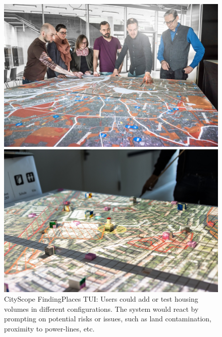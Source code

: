 \begin{figure}[!tbp]
  \centering
  \begin{minipage}[b]{0.48\textwidth}
    \includegraphics[width=\textwidth]{figures/finidingplaces1.jpg}
  \end{minipage}
  \hfill
  \begin{minipage}[b]{0.48\textwidth}
   \includegraphics[width=\textwidth]{figures/finidingplaces0.jpg}
  \end{minipage}
    \hfill
   \caption{CityScope FindingPlaces TUI: Users could add or test housing volumes in different configurations. The system would react by prompting on potential risks or issues, such as land contamination, proximity to power-lines, etc.  }
\end{figure}


